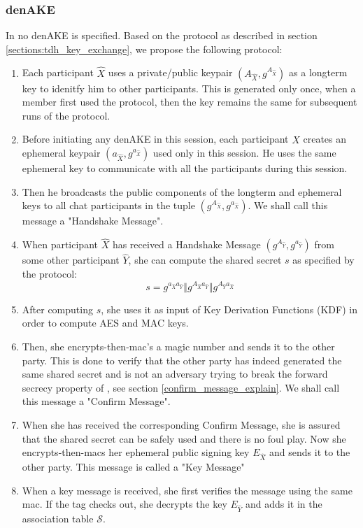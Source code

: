 \subsubsection{denAKE}
In \cite{mpotr} no denAKE is specified. Based on the \tdhname protocol as described in section \ref{sections:tdh_key_exchange}, we propose the following protocol:

\begin{enumerate}

  \item Each participant $\hat{X}$ uses a private/public \dhname keypair $(A_{\hat{X}}, g^{A_{\hat{X}}})$ as a longterm key to idenitfy him to other participants. This is generated only once, when a member first used the protocol, then the key remains the same for subsequent runs of the protocol.

  \item Before initiating any denAKE in this session, each participant $\hat{X}$ creates an ephemeral \dhname keypair $(a_{\hat{X}},g^{a_{\hat{X}}})$ used only in this session. He uses the same ephemeral key	to communicate with all the participants during this session.

  \item Then he broadcasts the public components of the longterm and ephemeral keys to all chat participants in the tuple $(g^{A_{\hat{X}}}, g^{a_{\hat{X}}})$. We shall call this message a "Handshake Message".

  \item When participant $\hat{X}$ has received a Handshake Message $(g^{A_{\hat{Y}}}, g^{a_{\hat{Y}}})$ from some other participant $\hat{Y}$, she can compute the shared secret $s$ as specified by the \tdhname protocol:
\[
  s = g^{a_{\hat{X}}a_{\hat{Y}}} \Vert g^{A_{\hat{X}}a_{\hat{Y}}} \Vert g^{A_{\hat{Y}}a_{\hat{X}}}
\]

  \item After computing $s$, she uses it as input of Key Derivation Functions (KDF) in order to compute AES and MAC keys.
  
  \item Then, she encrypts-then-mac's a magic number and sends it to the other party. This is done to verify that the other party has indeed generated the same shared secret and is not an adversary trying to break the forward secrecy property of \tdhname, see section \ref{confirm_message_explain}. We shall call this message a "Confirm Message".

  \item When she has received the corresponding Confirm Message, she is assured that the shared secret can be safely used and there is no foul play. Now she encrypts-then-macs her ephemeral public signing key $E_{\hat{X}}$ and sends it to the other party. This message is called a "Key Message"

  \item When a key message is received, she first verifies the message using the same mac. If the tag checks out, she decrypts the key $E_{\hat{Y}}$ and adds it in the association table $\mathcal{S}$.
  
\end{enumerate}

